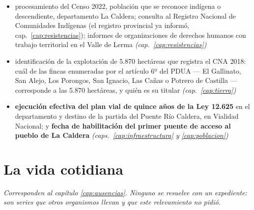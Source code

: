 \begin{itemize}[leftmargin=*]
\item procesamiento del Censo 2022, población que se reconoce indígena o descendiente, departamento La Caldera; consulta al Registro Nacional de Comunidades Indígenas (el registro provincial ya informó, cap.\ \ref{cap:resistencias}); informes de organizaciones de derechos humanos con trabajo territorial en el Valle de Lerma \textit{(cap.\ \ref{cap:resistencias})}
\item identificación de la explotación de 5.870 hectáreas que registra el CNA 2018: cuál de las fincas enumeradas por el artículo 6º del PDUA --- El Gallinato, San Alejo, Los Porongos, San Ignacio, Las Cañas o Potrero de Castilla --- corresponde a las 5.870 hectáreas, y quién es su titular \textit{(cap.\ \ref{cap:tierra})}
\item \textbf{ejecución efectiva del plan vial de quince años de la Ley 12.625} en el departamento y destino de la partida del Puente Río Caldera, en Vialidad Nacional; y \textbf{fecha de habilitación del primer puente de acceso al pueblo de La Caldera} \textit{(caps.\ \ref{cap:infraestructura} y \ref{cap:poblacion})}
\end{itemize}

\section{La vida cotidiana}

{\small\itshape Corresponden al capítulo \ref{cap:ausencias}. Ninguno se resuelve con un
expediente: son series que otros organismos llevan y que este relevamiento no pidió.\par}

